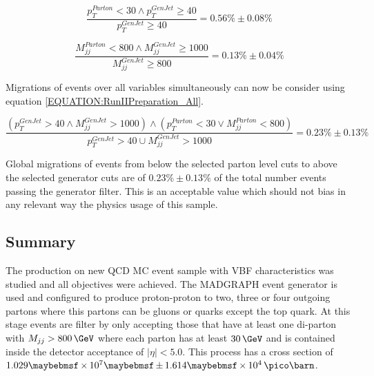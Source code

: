 \begin{equation}
\label{EQUATION:RunIIPreparation_SigleVariableMigrationSubleadPt}
\frac{p_{T}^{Parton}<30 \wedge p_{T}^{GenJet} \geq 40}{p_{T}^{GenJet} \geq 40}=0.56\% \pm 0.08\%
\end{equation}

\begin{equation}
\label{EQUATION:RunIIPreparation_SigleVariableMigrationMjj}
\frac{M_{jj}^{Parton}<800 \wedge M_{jj}^{GenJet} \geq 1000}{M_{jj}^{GenJet} \geq 800}=0.13\% \pm 0.04\%
\end{equation}
\normalsize

Migrations of events over all variables simultaneously can now be consider using equation \ref{EQUATION:RunIIPreparation_All}.

\small
\begin{equation}
\label{EQUATION:RunIIPreparation_All}
\frac{(p_{T}^{GenJet}>40 \wedge M_{jj}^{GenJet}>1000) \wedge (p_{T}^{Parton}<30 \vee M_{jj}^{Parton}<800)}{p_{T}^{GenJet}>40 \cup M_{jj}^{GenJet}>1000} = 0.23\% \pm 0.13\%
\end{equation}
\normalsize

Global migrations of events from below the selected parton level cuts to above the selected generator cuts are of $0.23\% \pm 0.13\%$ of the total number events passing the generator filter. This is an acceptable value which should not bias in any relevant way the physics usage of this sample.

\subsection{Summary}
\label{SUBSECTION:RunIIPreparation_Summary}


The production on new \gls{QCD} \gls{MC} event sample with \gls{VBF} characteristics was studied and all objectives were achieved. The \textsc{MADGRAPH} event generator is used and configured to produce proton-proton to two, three or four outgoing partons where this partons can be gluons or quarks except the top quark. At this stage events are filter by only accepting those that have at least one di-parton with $M_{jj}>800\,\GeV$ where each parton has at least $30\,\GeV$ and is contained inside the detector acceptance of $|\eta|<5.0$. This process has a cross section of $1.029 \times 10^7 \pm 1.614 \times 10^4 \,\pico\barn$. 

